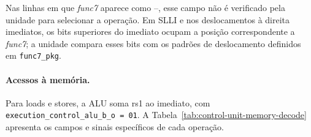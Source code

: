 Nas linhas em que \textit{func7} aparece como --, esse campo não é verificado pela unidade para selecionar a operação. Em SLLI e nos deslocamentos à direita imediatos, os bits superiores do imediato ocupam a posição correspondente a \textit{func7}; a unidade compara esses bits com os padrões de deslocamento definidos em \texttt{func7\_pkg}.

\paragraph{Acessos à memória.}
Para loads e stores, a ALU soma rs1 ao imediato, com \texttt{execution\_control\_alu\_b\_o = 01}. A Tabela~\ref{tab:control-unit-memory-decode} apresenta os campos e sinais específicos de cada operação.


